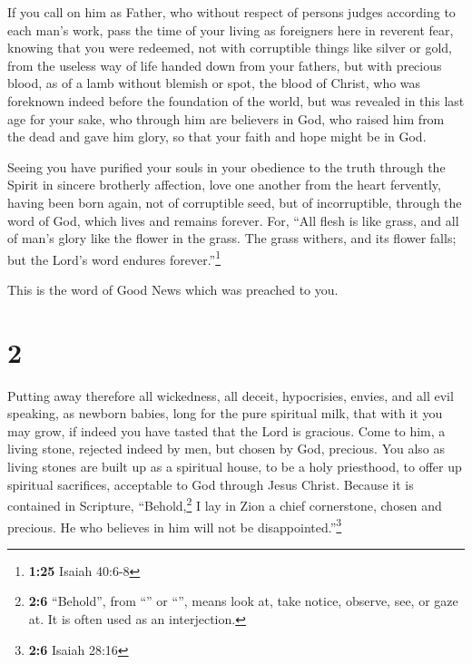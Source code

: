  If you call on him as Father, who without respect of
persons judges according to each man's work, pass the time of your
living as foreigners here in reverent fear,  knowing that
you were redeemed, not with corruptible things like silver or gold, from
the useless way of life handed down from your fathers, 
but with precious blood, as of a lamb without blemish or spot, the blood
of Christ,  who was foreknown indeed before the
foundation of the world, but was revealed in this last age for your
sake,  who through him are believers in God, who raised
him from the dead and gave him glory, so that your faith and hope might
be in God.

 Seeing you have purified your souls in your obedience to
the truth through the Spirit in sincere brotherly affection, love one
another from the heart fervently,  having been born
again, not of corruptible seed, but of incorruptible, through the word
of God, which lives and remains forever.  For, ``All
flesh is like grass, and all of man's glory like the flower in the
grass. The grass withers, and its flower falls;  but the
Lord's word endures forever.''\footnote{\textbf{1:25} Isaiah 40:6-8}

This is the word of Good News which was preached to you.

\hypertarget{section-1}{%
\section{2}\label{section-1}}

 Putting away therefore all wickedness, all deceit,
hypocrisies, envies, and all evil speaking,  as newborn
babies, long for the pure spiritual milk, that with it you may grow,
 if indeed you have tasted that the Lord is gracious.
 Come to him, a living stone, rejected indeed by men, but
chosen by God, precious.  You also as living stones are
built up as a spiritual house, to be a holy priesthood, to offer up
spiritual sacrifices, acceptable to God through Jesus Christ.
 Because it is contained in Scripture,
``Behold,\footnote{\textbf{2:6} ``Behold'', from ``'' or
  ``'', means look at, take notice, observe, see, or gaze
  at. It is often used as an interjection.} I lay in Zion a chief
cornerstone, chosen and precious. He who believes in him will not be
disappointed.''\footnote{\textbf{2:6} Isaiah 28:16}

